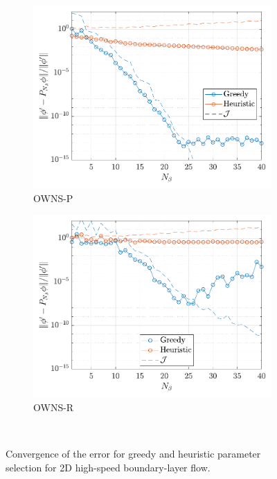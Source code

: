 \begin{figure}
    \centering
    \begin{subfigure}[b]{0.48\textwidth}
        \centering
        \includegraphics[width=1\linewidth]{figures/Zhong-OWNS-P.pdf}
        \caption{OWNS-P}
        \label{fig:zhong-err-p}
    \end{subfigure}
    \begin{subfigure}[b]{0.48\textwidth}
        \centering
        \includegraphics[width=1\linewidth]{figures/Zhong-OWNS-R.pdf}
        \caption{OWNS-R}
        \label{fig:zhong-err-r}
    \end{subfigure}\\
    \caption{Convergence of the error for greedy and heuristic parameter selection for 2D high-speed boundary-layer flow.}
    \label{fig:zhong-err}
\end{figure}



